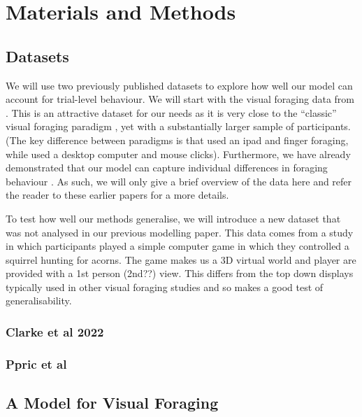 \documentclass[vision,article,submit,pdftex,moreauthors]{Definitions/mdpi}
\begin{document}
\section{Materials and Methods}

\subsection{Datasets}

We will use two previously published datasets to explore how well our model can account for trial-level behaviour. We will start with the visual foraging data from \cite{clarke2022qjep}. This is an attractive dataset for our needs as it is very close to the ``classic'' visual foraging paradigm \citep{kristjansson2014}, yet with a substantially larger sample of participants. (The key difference between paradigms is that \cite{kristjansson2014} used an ipad and finger foraging, while \cite{clarke2022qjep} used a desktop computer and mouse clicks). Furthermore, we have already demonstrated that our model can capture individual differences in foraging behaviour \citep{clarke2022foraging}. As such, we will only give a brief overview of the data here and refer the reader to these earlier papers for a more details.

To test how well our methods generalise, we will introduce a new dataset that was not analysed in our previous modelling paper. This \cite{prpic2019} data comes from a study in which participants played a simple computer game in which they controlled a squirrel hunting for acorns. The game makes us a 3D virtual world and player are provided with a 1st person (2nd??) view. This differs from the top down displays typically used in other visual foraging studies and so makes a good test of generalisability. 

\subsubsection{Clarke et al 2022}



\subsubsection{Ppric et al}

\subsection{A Model for Visual Foraging}
\end{document}

